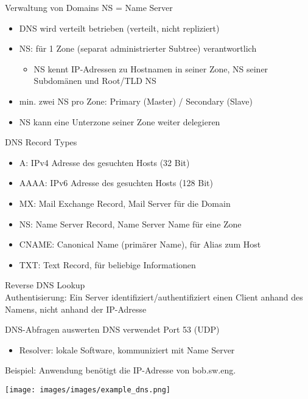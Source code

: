 \begin{concept}{Verwaltung von Domains} NS = Name Server
    \begin{itemize}
        \item DNS wird verteilt betrieben (verteilt, nicht repliziert)
        \item NS: für 1 Zone (separat administrierter Subtree) verantwortlich
        \begin{itemize}
            \item NS kennt IP-Adressen zu Hostnamen in seiner Zone, NS seiner Subdomänen und Root/TLD NS
        \end{itemize}
        \item min. zwei NS pro Zone: Primary (Master) / Secondary (Slave) 
        \item NS kann eine Unterzone seiner Zone weiter delegieren
    \end{itemize}
\end{concept}

\begin{definition}{DNS Record Types}
    \begin{itemize}
        \item A: IPv4 Adresse des gesuchten Hosts (32 Bit)
        \item AAAA: IPv6 Adresse des gesuchten Hosts (128 Bit)
        \item MX: Mail Exchange Record, Mail Server für die Domain 
        \item NS: Name Server Record, Name Server Name für eine Zone
        \item CNAME: Canonical Name (primärer Name), für Alias zum Host
        \item TXT: Text Record, für beliebige Informationen
    \end{itemize}
\end{definition}

\begin{definition}{Reverse DNS Lookup}\\
    Authentisierung: Ein Server identifiziert/authentifiziert einen Client anhand des Namens, nicht anhand der IP-Adresse
\end{definition}

\begin{example2}{DNS-Abfragen auswerten} DNS verwendet Port 53 (UDP)
    \begin{itemize}
        \item Resolver: lokale Software, kommuniziert mit Name Server 
    \end{itemize}
    Beispiel: Anwendung benötigt die IP-Adresse von bob.sw.eng.\\

        \texttt{[image: images/images/example\_dns.png]}        
\end{example2}

